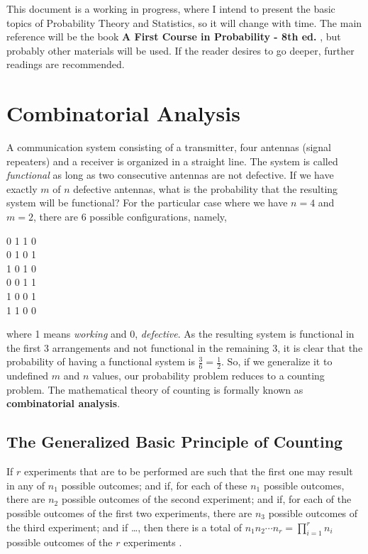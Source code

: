 \documentclass[a4paper,twocolumn]{article}
\begin{document}
This document is a working in progress, where I intend to present the basic topics of Probability Theory and Statistics, so it will change with time. The main reference will be the book \textbf{A First Course in Probability - 8th ed.} \cite{ross_2010}, but probably other materials will be used. If the reader desires to go deeper, further readings are recommended.


\section{Combinatorial Analysis}

A communication system consisting of a transmitter, four antennas (signal repeaters) and a receiver is organized in a straight line. The system is called \textit{functional} as long as two consecutive antennas are not defective. If we have exactly $m$ of $n$ defective antennas, what is the probability that the resulting system will be functional? For the particular case where we have $n = 4$ and $m = 2$, there are 6 possible configurations, namely,

\begin{center}
0 1 1 0\\
0 1 0 1\\
1 0 1 0\\
0 0 1 1\\
1 0 0 1\\
1 1 0 0
\end{center}

\noindent where 1 means \textit{working} and 0, \textit{defective}. As the resulting system is functional in the first 3 arrangements and not functional in the remaining 3, it is clear that the probability of having a functional system is $\frac{3}{6} = \frac{1}{2}$. So, if we generalize it to undefined $m$ and $n$ values, our probability problem reduces to a counting problem. The mathematical theory of counting is formally known as \textbf{combinatorial analysis}.


\subsection{The Generalized Basic Principle of Counting}

If $r$ experiments that are to be performed are such that the first one may result in any of $n_1$ possible outcomes; and if, for each of these $n_1$ possible outcomes, there are $n_2$ possible outcomes of the second experiment; and if, for each of the possible outcomes of the first two experiments, there are $n_3$ possible outcomes of the third experiment; and if \dots , then there is a total of $n_1 n_2 \dotsm n_r = \prod_{i=1}^{r} n_i$ possible outcomes of the $r$ experiments \cite{ross_2010}.\\
\end{document}
